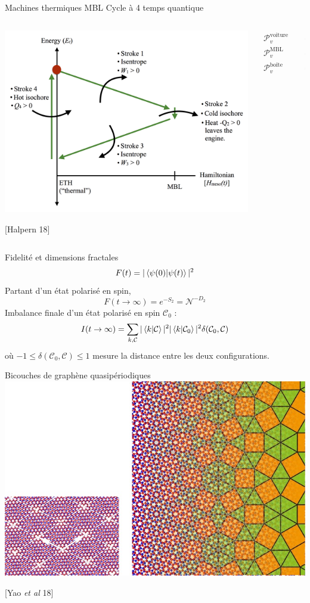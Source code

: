 \begin{frame}{Machines thermiques MBL}
Cycle à 4 temps quantique

\begin{columns}
\begin{column}{0.5\textwidth}
\centering
\includegraphics[width=0.8\columnwidth]{img/4_questions/Otto_cycle_MBL}

\footnotesize{[Halpern 18]}
\end{column}
\begin{column}{0.5\textwidth}
\begin{align*}
	\mathcal{P}_v^\text{voiture} &= 1~\text{MW}/\text{m}^3 \\
	\mathcal{P}_v^\text{MBL} &= 100~\text{kW}/\text{m}^3 \\
	\mathcal{P}_v^\text{boîte quantique} &= 1~\text{kW}/\text{m}^3 \\
\end{align*}
\end{column}
\end{columns}
\end{frame}

\begin{frame}{Fidelité et dimensions fractales}
\[
	F(t) = |\braket{\psi(0)}{\psi(t)}|^2
\]
Partant d'un état polarisé en spin,
\[
	F(t\to\infty) = e^{-S_2} = \mathcal{N}^{-D_2}
\]
Imbalance finale d'un état polarisé en spin $\mathcal{C}_0$ :
\[
	I(t \to \infty) = \sum_{k,\mathcal{C}} |\braket{k}{\mathcal{C}}|^2 |\braket{k}{\mathcal{C}_0}|^2 \delta(\mathcal{C}_0, \mathcal{C})
\]
où $-1 \leq \delta(\mathcal{C}_0, \mathcal{C}) \leq 1$ mesure la distance entre les deux configurations.
\end{frame}

\begin{frame}{Bicouches de graphène quasipériodiques}
\centering
\includegraphics[width=0.5\columnwidth]{img/4_questions/QC_bilayer}

[Yao \emph{et al} 18]
\end{frame}

